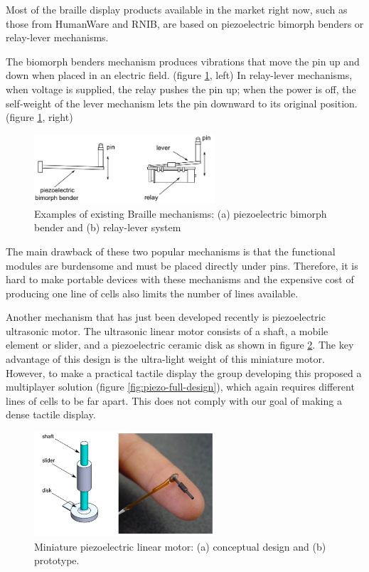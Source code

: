 Most of the braille display products available in the market right now, such as those from HumanWare and RNIB, are based on piezoelectric bimorph benders or relay-lever mechanisms.  

The biomorph benders mechanism produces vibrations that move the pin up and down when placed in an electric field. (figure \ref{fig:piezo-bender}, left) In relay-lever mechanisms, when voltage is supplied, the relay pushes the pin up; when the power is off, the self-weight of the lever mechanism lets the pin downward to its original position. (figure \ref{fig:piezo-bender}, right)

\begin{figure} \centering
    \includegraphics[width=0.6\textwidth]{figures/piezo-bender.png}
\caption{Examples of existing Braille mechanisms: (a) piezoelectric bimorph bender and (b) relay-lever system}
\label{fig:piezo-bender}
\end{figure}

The main drawback of these two popular mechanisms is that the functional modules are burdensome and must be placed directly under pins. Therefore, it is hard to make portable devices with these mechanisms and the expensive cost of producing one line of cells also limits the number of lines available. 

Another mechanism that has just been developed recently is piezoelectric ultrasonic motor.
The ultrasonic linear motor consists of a shaft, a mobile element or slider, and a piezoelectric ceramic disk as shown in figure \ref{fig:piezo-miniature}.
The key advantage of this design is the ultra-light weight of this miniature motor.
However, to make a practical tactile display the group developing this proposed a multiplayer solution (figure \ref{fig:piezo-full-design}), which again requires different lines of cells to be far apart. This does not comply with our goal of making a dense tactile display.

\begin{figure} \centering
    \includegraphics[width=0.6\textwidth]{figures/piezo-miniature.png}
\caption{Miniature piezoelectric linear motor: (a) conceptual design and (b) prototype.}
\label{fig:piezo-miniature}
\end{figure}

